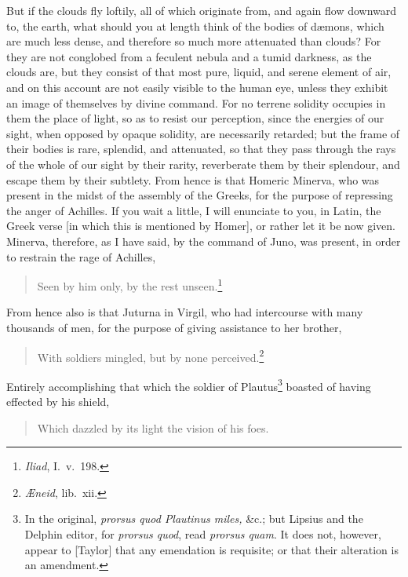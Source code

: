 \documentclass[twoside]{article}
\begin{document}
\noindent But if the clouds fly loftily, all of which originate from, and again
flow downward to, the earth, what should you at length think of the bodies of
d{\ae}mons, which are much less dense, and therefore so much more attenuated
than clouds? For they are not conglobed from a feculent nebula and a tumid
darkness, as the clouds are, but they consist of that most pure, liquid, and
serene element of air, and on this account are not easily visible to the human
eye, unless they exhibit an image of themselves by divine command. For no
terrene solidity occupies in them the place of light, so as to resist our
perception, since the energies of our sight, when opposed by opaque solidity,
are necessarily retarded; but the frame of their bodies is rare, splendid, and
attenuated, so that they pass through the rays of the whole of our sight by
their rarity, reverberate them by their splendour, and escape them by their
subtlety. From hence is that Homeric Minerva, who was present in the midst of
the assembly of the Greeks, for the purpose of repressing the anger of
Achilles. If you wait a little, I will enunciate to you, in Latin, the Greek
verse [in which this is mentioned by Homer], or rather let it be now given.
Minerva, therefore, as I have said, by the command of Juno, was present, in
order to restrain the rage of Achilles,

\begin{verse}
Seen by him only, by the rest unseen.\footnote{\textit{Iliad}, I.~v.~198.}
\end{verse}

\noindent From hence also is that Juturna in Virgil, who had intercourse
with many thousands of men, for the purpose of
giving assistance to her brother,

\begin{verse}
With soldiers mingled, but by none perceived.\footnote{\textit{{\AE}neid},
lib.~xii.}
\end{verse}

\noindent Entirely accomplishing that which the soldier of Plautus\footnote{In
the original, \textit{prorsus quod Plautinus miles,} \&c.; but Lipsius and the
Delphin editor, for \textit{prorsus quod}, read \textit{prorsus quam}. It does
not, however, appear to [Taylor] that any emendation is requisite; or that
their alteration is an amendment.} boasted of having effected by his shield,

\begin{verse}
Which dazzled by its light the vision of his foes.
\end{verse}
\end{document}
